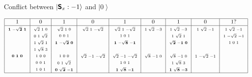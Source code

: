 \documentclass[11pt, a4paper]{article}
\theoremstyle{definition}
\newcommand{\ket}[1]{\left| #1 \right>}
\newcommand{\proj}[3]{\begin{smallmatrix} #1 & #2 & #3 \end{smallmatrix}}
\newcommand{\projbf}[3]{\begin{smallmatrix} \mathbf{#1} & \mathbf{#2} & \mathbf{#3} \end{smallmatrix}}
\begin{document}
\begin{table}[h!]
\vspace{-12pt}
\caption{Conflict between $\ket{\textsf{\textbf{S}}_x : -1}$ and $\ket{0}$}
\vspace{-36pt}
\label{tab:2}
$$\begin{array}[t]{|c|c|c|c|c|c|c|c|c|}
\hline
1 & 0 & 1 & 0 & 1 & 0 & 1 & 0 & 1? \\
\hline
\projbf{1}{-\sqrt{2}}{1} & \proj{\sqrt{2}}{1}{0} & \proj{\sqrt{2}}{1}{0} & \proj{\sqrt{2}}{1}{-\sqrt{2}} & \proj{\sqrt{2}}{1}{-\sqrt{2}} & \proj{1}{\sqrt{2}}{-3} & \proj{1}{\sqrt{2}}{-3} & \proj{1}{\sqrt{2}}{-1} & \proj{1}{\sqrt{2}}{-1} \\
~ & \proj{0}{1}{\sqrt{2}} & \proj{0}{0}{1} & ~ & \proj{1}{0}{1} & ~ & \proj{1}{\sqrt{2}}{1} & ~ & \proj{1}{-\sqrt{2}}{-1} \\
~ & \proj{1}{\sqrt{2}}{1} & \projbf{1}{-\sqrt{2}}{0} & ~ & \projbf{1}{-\sqrt{8}}{-1} & ~ & \projbf{\sqrt{2}}{-1}{0} & ~ & \proj{1}{0}{1} \\
~ & \proj{1}{\sqrt{8}}{3} & ~ & ~ & ~ & ~ & ~ & ~ & ~ \\
\projbf{0}{1}{0} & \proj{1}{0}{0} & \proj{1}{0}{0} & \proj{\sqrt{2}}{-1}{-\sqrt{2}} & \proj{\sqrt{2}}{-1}{-\sqrt{2}} & \proj{\sqrt{8}}{-1}{0} & \proj{\sqrt{8}}{-1}{0} & \proj{1}{-\sqrt{2}}{-1} & ~ \\
~ & \proj{0}{0}{1} & \proj{0}{1}{\sqrt{2}} & ~ & \proj{1}{0}{1} & ~ & \proj{1}{\sqrt{8}}{3} & ~ & ~ \\
~ & \proj{1}{0}{1} & \projbf{0}{\sqrt{2}}{-1} & ~ & \projbf{1}{\sqrt{8}}{-1} & ~ & \projbf{1}{\sqrt{8}}{-3} & ~ & ~ \\
\hline
\end{array}$$
\vspace{-12pt}
\end{table}
\end{document}
